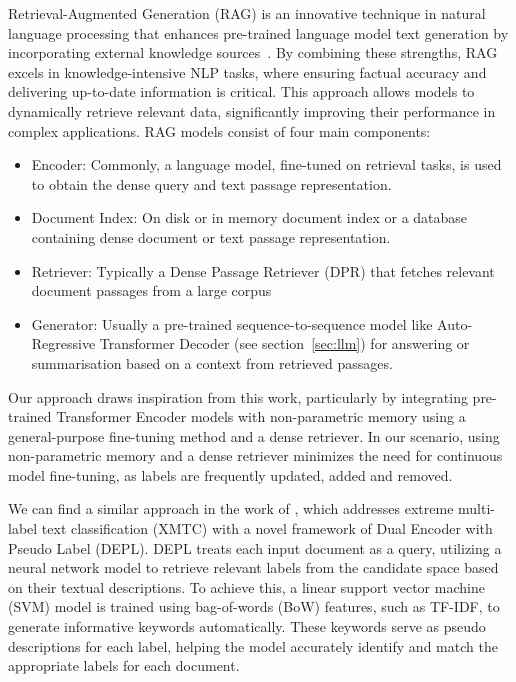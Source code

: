Retrieval-Augmented Generation (RAG) is an innovative technique in natural language processing that enhances pre-trained language model text generation by incorporating external knowledge sources~\parencite{lewis2021retrievalaugmentedgenerationknowledgeintensivenlp}. 
By combining these strengths, RAG excels in knowledge-intensive NLP tasks, where ensuring factual accuracy and delivering up-to-date information is critical. 
This approach allows models to dynamically retrieve relevant data, significantly improving their performance in complex applications. 
RAG models consist of four main components: 
\begin{itemize}
    \item Encoder: Commonly, a language model, fine-tuned on retrieval tasks, is used to obtain the dense query and text passage representation.
    \item Document Index: On disk or in memory document index or a database containing dense document or text passage representation.
    \item Retriever: Typically a Dense Passage Retriever (DPR) that fetches relevant document passages from a large corpus~\parencite{karpukhin2020dense}
    \item Generator: Usually a pre-trained sequence-to-sequence model like Auto-Regressive Transformer Decoder (see section~\ref{sec:llm}) for answering or summarisation based on a context from retrieved passages.
\end{itemize}

Our approach draws inspiration from this work, particularly by integrating pre-trained Transformer Encoder models with non-parametric memory using a general-purpose fine-tuning method and a dense retriever.
In our scenario, using non-parametric memory and a dense retriever minimizes the need for continuous model fine-tuning, as labels are frequently updated, added and removed. 

We can find a similar approach in the work of \textcite{zhang2023longtailed}, which addresses extreme multi-label text classification (XMTC) with a novel framework of Dual Encoder with Pseudo Label (DEPL).
DEPL treats each input document as a query, utilizing a neural network model to retrieve relevant labels from the candidate space based on their textual descriptions. 
To achieve this, a linear support vector machine (SVM) model is trained using bag-of-words (BoW) features, such as TF-IDF, to generate informative keywords automatically. 
These keywords serve as pseudo descriptions for each label, helping the model accurately identify and match the appropriate labels for each document.

